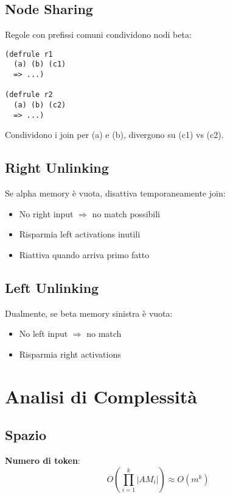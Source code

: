 \subsection{Node Sharing}

Regole con prefissi comuni condividono nodi beta:

\begin{lstlisting}[language=CLIPS]
(defrule r1
  (a) (b) (c1)
  => ...)

(defrule r2
  (a) (b) (c2)
  => ...)
\end{lstlisting}

Condividono i join per (a) e (b), divergono su (c1) vs (c2).

\subsection{Right Unlinking}

Se alpha memory è vuota, disattiva temporaneamente join:

\begin{itemize}
\item No right input $\Rightarrow$ no match possibili
\item Risparmia left activations inutili
\item Riattiva quando arriva primo fatto
\end{itemize}

\subsection{Left Unlinking}

Dualmente, se beta memory sinistra è vuota:

\begin{itemize}
\item No left input $\Rightarrow$ no match
\item Risparmia right activations
\end{itemize}

\section{Analisi di Complessità}

\subsection{Spazio}

\textbf{Numero di token}:
\begin{equation}
O\left(\prod_{i=1}^{k} |AM_i|\right) \approx O(m^k)
\end{equation}

